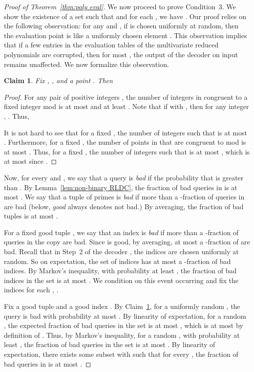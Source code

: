 \documentclass[11pt,english]{article}
\newtheorem{claim}[theorem]{Claim}
\theoremstyle{definition}
\theoremstyle{remark}
\begin{document}
\begin{proof}[Proof of Theorem~\ref{thm:poly eval}]
We now proceed to prove Condition~3. We show the existence of a set
 such that  and for each ,
we have .
Our proof relies on the following observation: for any 
and , if  is chosen uniformly at random,
then the evaluation point  is like a uniformly chosen element . 
This observation implies that if a few entries in the evaluation tables of the
multivariate reduced polynomials are corrupted, then for most , the output of the decoder  on input  remains unaffected. We now formalize this observation. 

\begin{claim}\label{claim:crt-random}
Fix , , and a point
. Then 
\end{claim}

\begin{proof} For any pair of positive integers , the number
of integers in  congruent to a fixed integer mod  is at
most  and at least . 
Note that if  with , then for any integer , .
Thus,  

It is not hard to see that for a fixed ,
the number of integers  such that 
is at most . Furthermore,
for a fixed , the number of points in 
that are congruent to  mod  is at most .
Thus, for a fixed , the number of integers
 such that  is at
most ,
which is at most  since .
\end{proof}

Now, for every  and , we say that
a query  is \emph{bad}
if the probability that 
is greater than . By Lemma~\ref{lem:non-binary RLDC},
the fraction of bad queries in 
is at most . We say that a tuple of primes
 is \emph{bad} if more than a -fraction
of queries in  are bad (below,
\emph{good} always denotes not bad.) By averaging, the fraction of
bad tuples  is at most .

For a fixed good tuple , we say that an index 
is \emph{bad} if more than a -fraction of queries in the
copy  are bad. Since 
is good, by averaging, at most a -fraction
of  are bad. Recall that in Step~2 of the decoder
, the indices 
are chosen uniformly at random. So on expectation, the set of indices
 has at most a -fraction
of bad indices. By Markov's inequality, with probability at least
, the fraction of bad indices in the set 
is at most . We condition on
this event occurring and fix the indices  for each
, .

Fix a good tuple  and a good index .
By Claim~\ref{claim:crt-random}, for a uniformly random ,
the query  is bad with
probability at most . By linearity of expectation, for
a random , the expected fraction of bad queries in the
set 
is at most , which
is at most  by definition of . Thus, by Markov's
inequality, for a random , with probability at least
, the fraction of bad queries in the set  is at most
. By linearity of expectation, there exists some subset 
with  such that for every , the fraction of
bad queries in  is at most . 


\end{proof}
\end{document}
